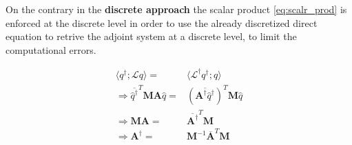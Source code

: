 On the contrary in the \textbf{discrete approach} the scalar product \ref{eq:scalr_prod} is enforced at the discrete level in order to use the already discretized direct equation to retrive the adjoint system at a discrete level, to limit the computational errors.

\begin{equation}
\begin{split}
\langle q^{\dagger}; \mathcal{L} q \rangle =& \langle {\mathcal{L}}^{\dagger} q^{\dagger} ; q \rangle \\
\Rightarrow \overline{\hat{q}^{\dagger}}^T \mathbf{M} \mathbf{A} \hat{q}  =& \left( \overline{{\mathbf{A}}^{\dagger} \hat{q}^{\dagger}} \right)^{T} \mathbf{M} \hat{q} \\
\Rightarrow \mathbf{M} \mathbf{A}  =&  {\overline{\mathbf{A}^{\dagger}}}^T \mathbf{M} \\
\Rightarrow {\mathbf{A}}^{\dagger}  =&  \mathbf{M}^{-1} \mathbf{\overline{A}}^T \mathbf{M}
\end{split}
\end{equation}